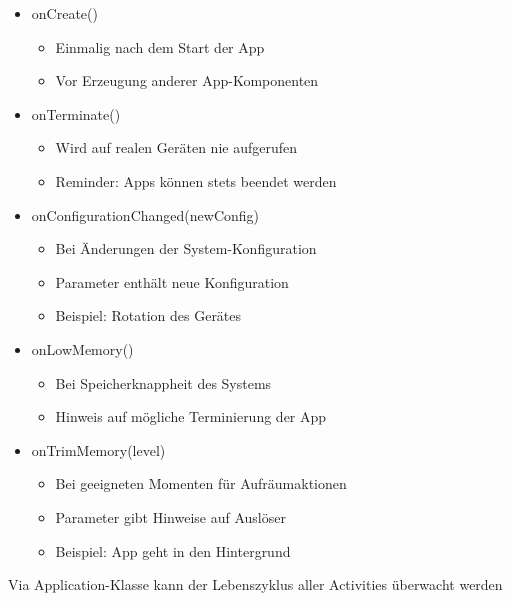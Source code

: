 \documentclass[10pt,landscape,a4paper]{article}
\begin{document}
\begin{multicols*}{3}
\begin{itemize}[leftmargin=*]
\item{onCreate()}
\begin{itemize}[leftmargin=*]
\item{Einmalig nach dem Start der App}
\item{Vor Erzeugung anderer App-Komponenten}
\end{itemize}
\item{onTerminate()}
\begin{itemize}[leftmargin=*]
\item{Wird auf realen Geräten nie aufgerufen}
\item{Reminder: Apps können stets beendet werden}
\end{itemize}
\item{onConfigurationChanged(newConfig)}
\begin{itemize}[leftmargin=*]
\item{Bei Änderungen der System-Konfiguration}
\item{Parameter enthält neue Konfiguration}
\item{Beispiel: Rotation des Gerätes}
\end{itemize}
\item{onLowMemory()}
\begin{itemize}[leftmargin=*]
\item{Bei Speicherknappheit des Systems}
\item{Hinweis auf mögliche Terminierung der App}
\end{itemize}
\item{onTrimMemory(level)}
\begin{itemize}[leftmargin=*]
\item{Bei geeigneten Momenten für Aufräumaktionen}
\item{Parameter gibt Hinweise auf Auslöser}
\item{Beispiel: App geht in den Hintergrund }
\end{itemize}
\end{itemize}

Via Application-Klasse kann der Lebenszyklus aller Activities überwacht werden


\end{multicols*}
\end{document}
